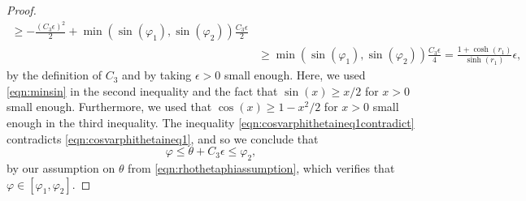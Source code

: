 \documentclass[10pt,a4paper]{amsart}
\begin{document}
\begin{proof}
\begin{align}
\geq  -\frac{(C_3 \epsilon)^2}{2}+\min(\sin(\varphi_1),\sin(\varphi_2))\frac{C_3\epsilon}{2} \nonumber \\
& \geq \min(\sin(\varphi_1),\sin(\varphi_2))\frac{C_3 \epsilon}{4}
=\frac{1+\cosh(r_1)}{\sinh(r_1)}\epsilon, \nonumber
\end{align}
by the definition of $C_3$ and by taking $\epsilon>0$ small enough. 
Here, we used \eqref{eqn:minsin} in the second inequality
and the fact that $\sin(x)\geq x/2$ for $x>0$ small enough. Furthermore, 
we used that $\cos(x)\geq 1-x^2/2$ for $x>0$ small enough in the third inequality. 
The inequality \eqref{eqn:cosvarphithetaineq1contradict} contradicts 
\eqref{eqn:cosvarphithetaineq1}, and so we conclude that 
\begin{equation} \label{eqn:varphiupperbound}
\varphi\leq \theta+C_3\epsilon
\leq \varphi_2,
\end{equation}
by our assumption on $\theta$ from \eqref{eqn:rhothetaphiassumption},
which verifies that $\varphi\in[\varphi_1,\varphi_2].$



\end{proof}
\end{document}
